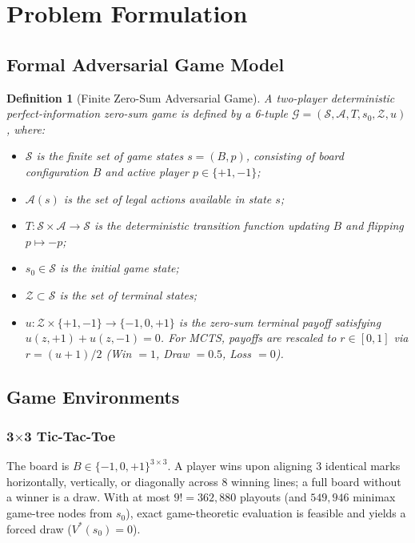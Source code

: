 \documentclass[conference]{IEEEtran}
\newtheorem{definition}{Definition}
\begin{document}
\section{Problem Formulation}
\subsection{Formal Adversarial Game Model}
\begin{definition}[Finite Zero-Sum Adversarial Game]
A two-player deterministic perfect-information zero-sum game is defined by a 6-tuple $\mathcal{G} = (\mathcal{S}, \mathcal{A}, T, s_0, \mathcal{Z}, u)$, where:
\begin{itemize}
    \item $\mathcal{S}$ is the finite set of game states $s = (B, p)$, consisting of board configuration $B$ and active player $p \in \{+1, -1\}$;
    \item $\mathcal{A}(s)$ is the set of legal actions available in state $s$;
    \item $T: \mathcal{S} \times \mathcal{A} \to \mathcal{S}$ is the deterministic transition function updating $B$ and flipping $p \mapsto -p$;
    \item $s_0 \in \mathcal{S}$ is the initial game state;
    \item $\mathcal{Z} \subset \mathcal{S}$ is the set of terminal states;
    \item $u: \mathcal{Z} \times \{+1, -1\} \to \{-1, 0, +1\}$ is the zero-sum terminal payoff satisfying $u(z, +1) + u(z, -1) = 0$. For MCTS, payoffs are rescaled to $r \in [0, 1]$ via $r = (u+1)/2$ (Win $=1$, Draw $=0.5$, Loss $=0$).
\end{itemize}
\end{definition}

\subsection{Game Environments}
\subsubsection{3$\times$3 Tic-Tac-Toe}
The board is $B \in \{-1, 0, +1\}^{3\times 3}$. A player wins upon aligning 3 identical marks horizontally, vertically, or diagonally across 8 winning lines; a full board without a winner is a draw. With at most $9! = 362{,}880$ playouts (and $549{,}946$ minimax game-tree nodes from $s_0$), exact game-theoretic evaluation is feasible and yields a forced draw ($V^*(s_0) = 0$).
\end{document}
